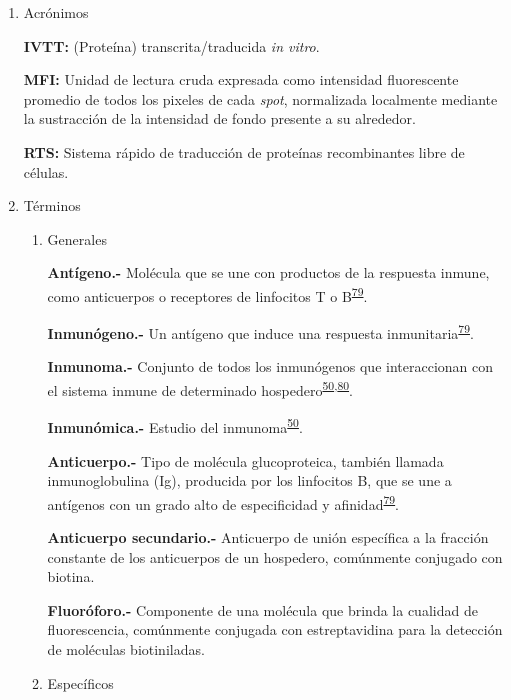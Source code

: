 \documentclass[]{article}
\begin{document}
\begin{enumerate}
\def\labelenumi{\alph{enumi}.}
\item
  Acrónimos

  \textbf{IVTT:} (Proteína) transcrita/traducida \emph{in vitro}.

  \textbf{MFI:} Unidad de lectura cruda expresada como intensidad
  fluorescente promedio de todos los pixeles de cada \emph{spot},
  normalizada localmente mediante la sustracción de la intensidad de
  fondo presente a su alrededor.

  \textbf{RTS:} Sistema rápido de traducción de proteínas recombinantes
  libre de células.
\item
  Términos

  \begin{enumerate}
  \def\labelenumii{\roman{enumii}.}
  \item
    Generales

    \textbf{Antígeno.-} Molécula que se une con productos de la
    respuesta inmune, como anticuerpos o receptores de linfocitos T o
    B\textsuperscript{\protect\hyperlink{ref-abbas2012}{79}}.

    \textbf{Inmunógeno.-} Un antígeno que induce una respuesta
    inmunitaria\textsuperscript{\protect\hyperlink{ref-abbas2012}{79}}.

    \textbf{Inmunoma.-} Conjunto de todos los inmunógenos que
    interaccionan con el sistema inmune de determinado
    hospedero\textsuperscript{\protect\hyperlink{ref-immunomics2016}{50},\protect\hyperlink{ref-sette2005}{80}}.

    \textbf{Inmunómica.-} Estudio del
    inmunoma\textsuperscript{\protect\hyperlink{ref-immunomics2016}{50}}.

    \textbf{Anticuerpo.-} Tipo de molécula glucoproteica, también
    llamada inmunoglobulina (Ig), producida por los linfocitos B, que se
    une a antígenos con un grado alto de especificidad y
    afinidad\textsuperscript{\protect\hyperlink{ref-abbas2012}{79}}.

    \textbf{Anticuerpo secundario.-} Anticuerpo de unión específica a la
    fracción constante de los anticuerpos de un hospedero, comúnmente
    conjugado con biotina.

    \textbf{Fluoróforo.-} Componente de una molécula que brinda la
    cualidad de fluorescencia, comúnmente conjugada con estreptavidina
    para la detección de moléculas biotiniladas.
  \item
    Específicos


\end{enumerate}
\end{enumerate}
\end{document}
